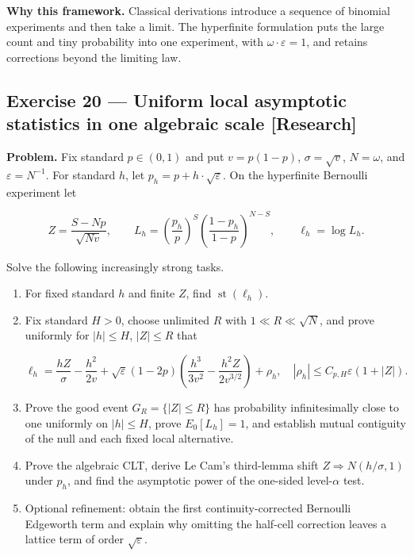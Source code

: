 \documentclass[11pt]{article}
\newcommand{\eps}{\varepsilon}
\renewcommand{\epsilon}{\varepsilon}
\newcommand{\st}{\operatorname{st}}
\begin{document}
\textbf{Why this framework.} Classical derivations introduce a sequence of
binomial experiments and then take a limit. The hyperfinite formulation puts
the large count and tiny probability into one experiment, with
$\omega\cdot \eps=1$, and retains corrections beyond the limiting law.


\subsection*{Exercise 20 --- Uniform local asymptotic statistics in one algebraic scale \hfill \normalfont\small[Research]}

\textbf{Problem.} Fix standard $p\in (0,1)$ and put
$v=p(1-p)$, $\sigma=\sqrt{v}$, $N=\omega$, and $\eps=N^{-1}$. For standard
$h$, let $p_h=p+h\cdot \sqrt{\eps}$. On the hyperfinite Bernoulli experiment let

\[
Z=\frac{S-Np}{\sqrt{Nv}},\qquad
L_h=\left(\frac{p_h}{p}\right)^S
    \left(\frac{1-p_h}{1-p}\right)^{N-S},\qquad
\ell_h=\log L_h.
\]

Solve the following increasingly strong tasks.

\begin{enumerate}[leftmargin=*]
\item For fixed standard $h$ and finite $Z$, find $\st(\ell_h)$.
\item Fix standard $H>0$, choose unlimited $R$ with
   $1 \ll  R \ll  \sqrt{N}$, and prove uniformly for $|h|\le H$, $|Z|\le R$ that

   \[
   \ell_h=\frac{hZ}{\sigma}-\frac{h^2}{2v}
   +\sqrt\epsilon(1-2p)
      \left(\frac{h^3}{3v^2}-\frac{h^2Z}{2v^{3/2}}\right)
   +\rho_h,
   \quad |\rho_h|\le C_{p,H}\epsilon(1+|Z|).
   \]

\item Prove the good event $G_R=\{|Z|\le R\}$ has probability infinitesimally
   close to one uniformly on $|h|\le H$, prove $E_0[L_h]=1$, and establish
   mutual contiguity of the null and each fixed local alternative.
\item Prove the algebraic CLT, derive Le Cam's third-lemma shift
   $Z \Rightarrow  N(h/\sigma,1)$ under $p_{h}$, and find the asymptotic power of the
   one-sided level-$\alpha$ test.
\item Optional refinement: obtain the first continuity-corrected Bernoulli
   Edgeworth term and explain why omitting the half-cell correction leaves a
   lattice term of order $\sqrt{\eps}$.
\end{enumerate}
\end{document}
